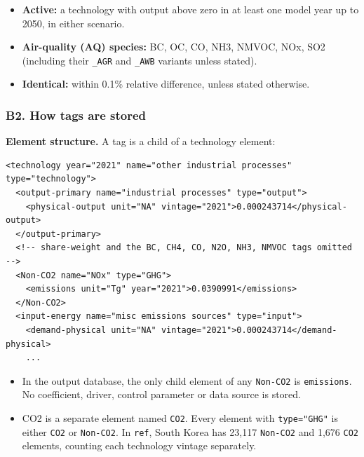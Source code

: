 \begin{itemize}
\tightlist
\item
  \textbf{Active:}
  a
  technology
  with
  output
  above
  zero in
  at least
  one
  model
  year up
  to 2050,
  in
  either
  scenario.
\item
  \textbf{Air-quality
  (AQ)
  species:}
  BC, OC,
  CO, NH3,
  NMVOC,
  NOx, SO2
  (including
  their
  \texttt{\_\allowbreak{}AGR}
  and
  \texttt{\_\allowbreak{}AWB}
  variants
  unless
  stated).
\item
  \textbf{Identical:}
  within
  0.1\%
  relative
  difference,
  unless
  stated
  otherwise.
\end{itemize}

\hypertarget{b2.-how-tags-are-stored}{%
\subsubsection{B2.
How tags
are
stored}\label{b2.-how-tags-are-stored}}

\textbf{Element
structure.}
A tag is a
child of a
technology
element:

\begin{Verbatim}[breaklines,fontsize=\footnotesize]
<technology year="2021" name="other industrial processes" type="technology">
  <output-primary name="industrial processes" type="output">
    <physical-output unit="NA" vintage="2021">0.000243714</physical-output>
  </output-primary>
  <!-- share-weight and the BC, CH4, CO, N2O, NH3, NMVOC tags omitted -->
  <Non-CO2 name="NOx" type="GHG">
    <emissions unit="Tg" year="2021">0.0390991</emissions>
  </Non-CO2>
  <input-energy name="misc emissions sources" type="input">
    <demand-physical unit="NA" vintage="2021">0.000243714</demand-physical>
    ...
\end{Verbatim}

\begin{itemize}
\tightlist
\item
  In the
  output
  database,
  the only
  child
  element
  of any
  \texttt{Non-\allowbreak{}CO2}
  is
  \texttt{emissions}.
  No
  coefficient,
  driver,
  control
  parameter
  or data
  source
  is
  stored.
\item
  CO2 is a
  separate
  element
  named
  \texttt{CO2}.
  Every
  element
  with
  \texttt{type=\allowbreak{}"GHG"}
  is
  either
  \texttt{CO2}
  or
  \texttt{Non-\allowbreak{}CO2}.
  In
  \texttt{ref},
  South
  Korea
  has
  23,117
  \texttt{Non-\allowbreak{}CO2}
  and
  1,676
  \texttt{CO2}
  elements,
  counting
  each
  technology
  vintage
  separately.
\end{itemize}

